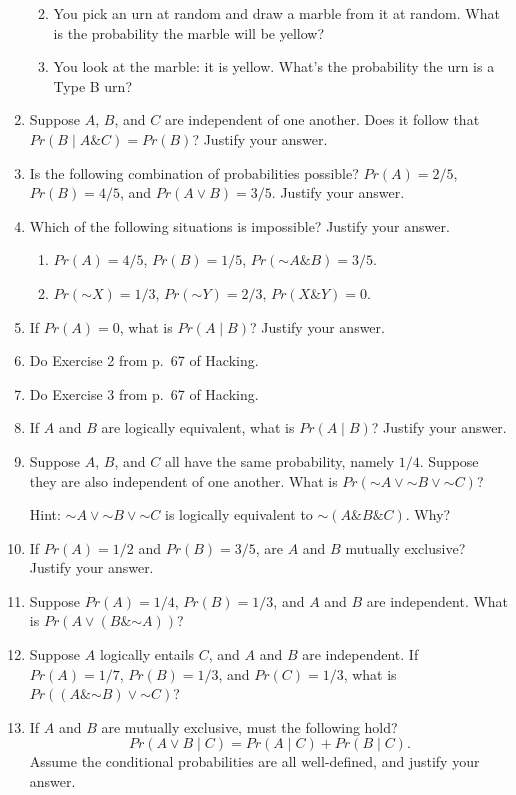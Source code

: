 \documentclass[justified]{tufte-book}
\providecommand{\tightlist}{%
  \setlength{\itemsep}{0pt}\setlength{\parskip}{0pt}}
\newcommand{\given}{\mid}
\renewcommand{\neg}{\mathbin{\sim}}
\renewcommand{\wedge}{\mathbin{\&}}
\newcommand{\p}{Pr}
\theoremstyle{definition}
\theoremstyle{definition}
\theoremstyle{definition}
\theoremstyle{remark}
\begin{document}
\begin{enumerate}
  \begin{enumerate}
  \def\labelenumii{\alph{enumii}.}
  \tightlist
  \item
    You pick an urn at random and draw a marble from it at random. What
    is the probability the marble will be yellow?
  \item
    You look at the marble: it is yellow. What's the probability the urn
    is a Type B urn?
  \end{enumerate}
\item
  Suppose \(A\), \(B\), and \(C\) are independent of one another. Does
  it follow that \(\p(B \given A \wedge C) = \p(B)\)? Justify your
  answer.
\item
  Is the following combination of probabilities possible?
  \(Pr(A) = 2/5\), \(Pr(B) = 4/5\), and \(Pr(A \vee B) = 3/5\). Justify
  your answer.
\item
  Which of the following situations is impossible? Justify your answer.

  \begin{enumerate}
  \def\labelenumii{\alph{enumii}.}
  \tightlist
  \item
    \(\p(A) = 4/5\), \(\p(B) = 1/5\), \(\p(\neg A \wedge B) = 3/5\).
  \item
    \(\p(\neg X) = 1/3\), \(\p(\neg Y) = 2/3\), \(\p(X \wedge Y) = 0\).
  \end{enumerate}
\item
  If \(Pr(A)=0\), what is \(\p(A \given B)\)? Justify your answer.
\item
  Do Exercise 2 from p.~67 of Hacking.
\item
  Do Exercise 3 from p.~67 of Hacking.
\item
  If \(A\) and \(B\) are logically equivalent, what is
  \(\p(A \given B)\)? Justify your answer.
\item
  Suppose \(A\), \(B\), and \(C\) all have the same probability, namely
  \(1/4\). Suppose they are also independent of one another. What is
  \(\p(\neg A \vee \neg B \vee \neg C)\)?

  Hint: \(\neg A \vee \neg B \vee \neg C\) is logically equivalent to
  \(\neg (A \wedge B \wedge C)\). Why?
\item
  If \(\p(A) = 1/2\) and \(\p(B) = 3/5\), are \(A\) and \(B\) mutually
  exclusive? Justify your answer.
\item
  Suppose \(\p(A) = 1/4\), \(\p(B) = 1/3\), and \(A\) and \(B\) are
  independent. What is \(\p(A \vee (B \wedge \neg A))\)?
\item
  Suppose \(A\) logically entails \(C\), and \(A\) and \(B\) are
  independent. If \(\p(A) = 1/7\), \(\p(B) = 1/3\), and \(\p(C)=1/3\),
  what is \(\p((A \wedge \neg B) \vee \neg C)\)?
\item
  If \(A\) and \(B\) are mutually exclusive, must the following hold?
  \[\p(A \vee B \given C) = \p(A \given C) + \p(B \given C).\] Assume
  the conditional probabilities are all well-defined, and justify your
  answer.


\end{enumerate}
\end{document}
